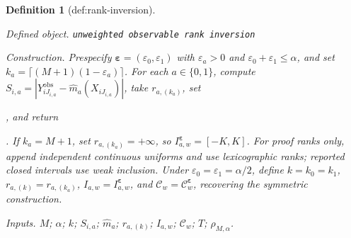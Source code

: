 \documentclass{article}
\newtheorem{definition}{Definition}
\begin{document}
\begin{definition}[def:rank-inversion]\label{def:rank-inversion}
\par\smallskip\noindent\emph{Defined object.} \texttt{unweighted observable rank inversion}
\par\smallskip\noindent\emph{Construction.} Prespecify \(\boldsymbol\varepsilon=(\varepsilon_0,\varepsilon_1)\) with \(\varepsilon_a>0\) and \(\varepsilon_0+\varepsilon_1\le\alpha\), and set \(k_a=\lceil(M+1)(1-\varepsilon_a)\rceil\). For each \(a\in\{0,1\}\), compute \(S_{i,a}=|Y^{\mathrm{obs}}_{iJ_{i,a}}-\widehat m_a(X_{iJ_{i,a}})|\), take \(r_{a,(k_a)}\), set \par\noindent {}\par\noindent, and return \par\noindent {}\par\noindent. If \(k_a=M+1\), set \(r_{a,(k_a)}=+\infty\), so \(I^{\boldsymbol\varepsilon}_{a,w}=[-K,K]\). For proof ranks only, append independent continuous uniforms and use lexicographic ranks; reported closed intervals use weak inclusion. Under \(\varepsilon_0=\varepsilon_1=\alpha/2\), define \(k=k_0=k_1\), \(r_{a,(k)}=r_{a,(k_a)}\), \(I_{a,w}=I^{\boldsymbol\varepsilon}_{a,w}\), and \(\mathcal C_w=\mathcal C^{\boldsymbol\varepsilon}_w\), recovering the symmetric construction.
\par\smallskip\noindent\emph{Inputs.} \(M\); \(\alpha\); \(k\); \(S_{i,a}\); \(\widehat m_a\); \(r_{a,(k)}\); \(I_{a,w}\); \(\mathcal C_w\); \(T\); \(\rho_{M,\alpha}\).
\end{definition}
\end{document}
